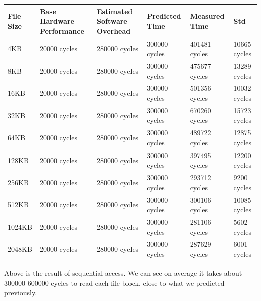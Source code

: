 \begin{center}
\begin{tabular}{| p{2cm} | p{2.5cm} | p{2.5cm} | p{2.5cm} | p{2.5cm} | p{3cm}}
File Size &  Base Hardware Performance  & Estimated Software Overhead  & Predicted Time  & Measured Time & Std  \\

\hline
4KB & 20000 cycles& 280000 cycles& 300000 cycles& 401481 cycles & 10665 cycles \\ 
8KB & 20000 cycles& 280000 cycles& 300000 cycles& 475677 cycles & 13289 cycles \\ 
16KB & 20000 cycles& 280000 cycles& 300000 cycles& 501356 cycles & 10032 cycles \\
32KB & 20000 cycles& 280000 cycles& 300000 cycles& 670260 cycles & 15723 cycles \\
64KB & 20000 cycles& 280000 cycles& 300000 cycles& 489722 cycles & 12875 cycles \\
128KB & 20000 cycles& 280000 cycles& 300000 cycles& 397495 cycles & 12200 cycles \\
256KB & 20000 cycles& 280000 cycles& 300000 cycles& 293712 cycles & 9200 cycles \\
512KB & 20000 cycles& 280000 cycles& 300000 cycles& 300106 cycles &  10085 cycles \\
1024KB & 20000 cycles& 280000 cycles& 300000 cycles& 281106 cycles & 5602 cycles \\
2048KB & 20000 cycles& 280000 cycles& 300000 cycles& 287629 cycles & 6001 cycles \\

\end{tabular}
\end{center}

Above is the result of sequential access. We can see on average it takes about 300000-600000 cycles to read each file block, close to what we predicted previously.

